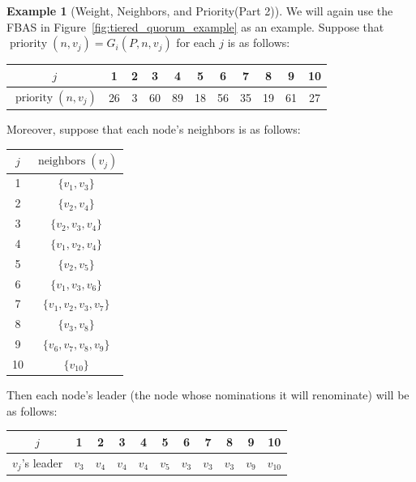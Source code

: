 \documentclass[12pt, psamsfonts]{amsart}
\theoremstyle{definition}
\newtheorem{exmp}[thm]{Example}
\theoremstyle{remark}
\DeclareMathOperator{\neighbors}{neighbors}
\DeclareMathOperator{\priority}{priority}
\numberwithin{equation}{subsection}
\begin{document}
\begin{exmp}[Weight, Neighbors, and Priority(Part 2)]
    We will again use the FBAS in Figure~\ref{fig:tiered_quorum_example} as an example.
    Suppose that $\priority(n, v_j) = G_i(P, n, v_j)$ for each $j$ is as follows:
    \begin{center}
      \begin{tabular}{ | c | c | c | c | c | c | c | c | c | c | c | }
        \hline
            $j$ & 1 & 2 & 3 & 4 & 5 & 6 & 7 & 8 & 9 & 10 \\ \hline
            $\priority(n, v_j)$ &  26 & 3 & 60 & 89 & 18 & 56 & 35 & 19 & 61 & 27\\
        \hline
      \end{tabular}
    \end{center}
    Moreover, suppose that each node's neighbors is as follows:
    \begin{center}
      \begin{tabular}{ | c | c | }
        \hline
            $j$ & $\neighbors(v_j)$ \\ \hline
            1 & $\{ v_1, v_3 \}$ \\ \hline
            2 & $\{ v_2, v_4 \}$ \\ \hline
            3 & $\{ v_2, v_3, v_4 \}$ \\ \hline
            4 & $\{ v_1, v_2, v_4 \}$ \\ \hline
            5 & $\{ v_2, v_5 \}$ \\ \hline
            6 & $\{ v_1, v_3, v_6\}$ \\ \hline
            7 & $\{ v_1, v_2, v_3, v_7 \}$ \\ \hline
            8 & $\{ v_3, v_8 \}$ \\ \hline
            9 & $\{ v_6, v_7, v_8, v_9 \}$ \\ \hline
            10 & $\{ v_{10} \}$ \\
        \hline
      \end{tabular}
    \end{center}

    Then each node's leader (the node whose nominations it will renominate) will be as follows:
    \begin{center}
      \begin{tabular}{ | c | c | c | c | c | c | c | c | c | c | c | }
        \hline
            $j$ & 1 & 2 & 3 & 4 & 5 & 6 & 7 & 8 & 9 & 10 \\ \hline
            $v_j$'s leader & $v_3$ & $v_4$ & $v_4$ & $v_4$ & $v_5$ & $v_3$ & $v_3$ & $v_3$ & $v_9$ & $v_{10}$ \\
        \hline
      \end{tabular}
    \end{center}


\end{exmp}
\end{document}
